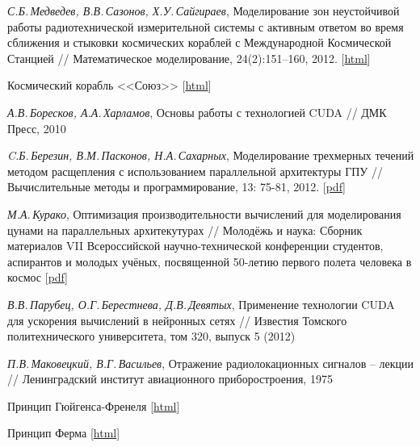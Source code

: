 \newpage
\begin{thebibliography}{99}

  \textit{С.Б.\,Медведев, В.В.\,Сазонов, Х.У.\,Сайгираев}, Моделирование зон неустойчивой работы радиотехнической измерительной системы с активным ответом во время сближения и стыковки космических кораблей с Международной Космической Станцией
  // Математическое моделирование, 24(2):151–160, 2012.
  [\href{http://istina.imec.msu.ru/publications/article/533721/}{html}]

  Космический корабль <<Союз>>
  [\href{http://ru.wikipedia.org/wiki/%D0%A1%D0%BE%D1%8E%D0%B7_(%D0%BA%D0%BE%D1%81%D0%BC%D0%B8%D1%87%D0%B5%D1%81%D0%BA%D0%B8%D0%B9_%D0%BA%D0%BE%D1%80%D0%B0%D0%B1%D0%BB%D1%8C)}{html}]

  \textit{А.В.\,Боресков, А.А.\,Харламов}, Основы работы с технологией CUDA
  // ДМК Пресс, 2010

  \textit{C.Б.\,Березин, В.М.\,Пасконов, Н.А.\,Сахарных}, Моделирование трехмерных течений методом расщепления с использованием параллельной архитектуры ГПУ
 // Вычислительные методы и программирование, 13: 75-81, 2012.
  [\href{http://num-meth.srcc.msu.ru/zhurnal/tom_2012/pdf/v13r210.pdf}{pdf}]

  \textit{М.А.\,Курако}, Оптимизация производительности вычислений для моделирования цунами на параллельных архитекутурах
  // Молодёжь и наука: Сборник материалов VII Всероссийской научно-технической конференции студентов, аспирантов и молодых учёных, посвященной 50-летию первого полета человека в космос
  [\href{http://elib.sfu-kras.ru/bitstream/2311/5869/1/s3_029.pdf}{pdf}]
  
  \textit{В.В.\,Парубец, О.Г.\,Берестнева, Д.В.\,Девятых}, Применение технологии CUDA для ускорения вычислений в нейронных сетях
  // Известия Томского политехнического университета, том 320, выпуск 5 (2012)

  \textit{П.В.\,Маковецкий, В.Г.\,Васильев}, Отражение радиолокационных сигналов -- лекции
  // Ленинградский институт авиационного приборостроения, 1975

  Принцип Гюйгенса-Френеля
  [\href{http://ru.wikipedia.org/wiki/%D0%9F%D1%80%D0%B8%D0%BD%D1%86%D0%B8%D0%BF_%D0%93%D1%8E%D0%B9%D0%B3%D0%B5%D0%BD%D1%81%D0%B0_%E2%80%94_%D0%A4%D1%80%D0%B5%D0%BD%D0%B5%D0%BB%D1%8F}
  {html}]

  Принцип Ферма
  [\href{http://ru.wikipedia.org/wiki/%D0%9F%D1%80%D0%B8%D0%BD%D1%86%D0%B8%D0%BF_%D0%A4%D0%B5%D1%80%D0%BC%D0%B0}
  {html}]


\end{thebibliography}

